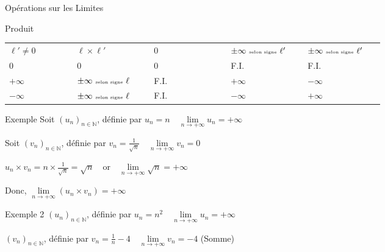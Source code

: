 \documentclass{cours}
\begin{document}
\begin{Gpartie}{Opérations sur les Limites}
\begin{Spartie}{Produit}
\begin{table}[H]
{\begin{tabular}{ p{0.15\linewidth} *{4}{M{0.17\linewidth} }}
                        $\ell'\neq0$& $\ell\times\ell'$                             & $0$ & $\pm\infty~\text{\tiny{selon signe}}~\ell'$ & $\pm\infty~\text{\tiny{selon signe}}~\ell'$   \\
                        $0$         & $0$                                           & $0$ & F.I.                                        & F.I.                                          \\
                        $+\infty$   & $\pm\infty~\text{\tiny{selon signe}}~\ell$    & F.I.& $+\infty$                                   & $-\infty$                                     \\
                        $-\infty$   & $\pm\infty~\text{\tiny{selon signe}}~\ell$    & F.I.& $-\infty$                                   & $+\infty$                                     \\ \bottomrule
                    \end{tabular}
                }
            \end{table}
            \begin{SSpartie}{Exemple} 
                Soit $(u_n)_{n\in\mathbb{N}}$, définie par $u_n=n\quad\lim\limits_{n\to +\infty}u_n=+\infty$

                Soit $(v_n)_{n\in\mathbb{N}}$, définie par $v_n=\frac{1}{\sqrt{n}}\quad\lim\limits_{n\to +\infty}v_n=0$

                $u_n\times v_n=n\times\frac{1}{\sqrt{n}}=\sqrt{n}\quad\text{or}\quad\lim\limits_{n\to +\infty}\sqrt{n}=+\infty$

                Donc, $\lim\limits_{n\to +\infty}(u_n\times v_n)=+\infty$
            \end{SSpartie}
            \begin{SSpartie}{Exemple 2} 
                $(u_n)_{n\in\mathbb{N}}$, définie par $u_n=n^2\quad\lim\limits_{n\to +\infty}u_n=+\infty$

                $(v_n)_{n\in\mathbb{N}}$, définie par $v_n=\frac{1}{n}-4\quad\lim\limits_{n\to +\infty}v_n=-4$ (Somme)


\end{SSpartie}
\end{Spartie}
\end{Gpartie}
\end{document}
